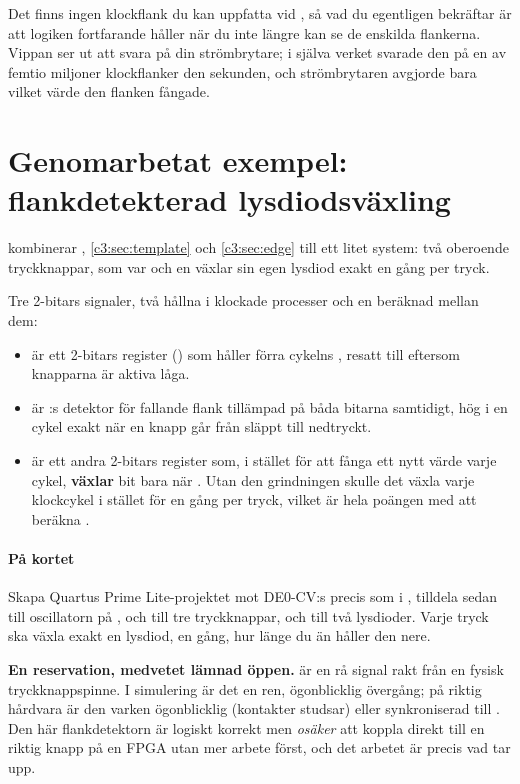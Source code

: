 Det finns ingen klockflank du kan uppfatta vid , så vad du egentligen bekräftar är att
logiken fortfarande håller när du inte längre kan se de enskilda flankerna. Vippan ser ut att svara
på din strömbrytare; i själva verket svarade den på en av femtio miljoner klockflanker den
sekunden, och strömbrytaren avgjorde bara vilket värde den flanken fångade.

\section{Genomarbetat exempel: flankdetekterad lysdiodsväxling}
\label{c3:sec:ledtoggle}

 kombinerar , \ref{c3:sec:template} och
\ref{c3:sec:edge} till ett litet system: två oberoende tryckknappar, som var och en växlar sin egen
lysdiod exakt en gång per tryck.


Tre 2-bitars signaler, två hållna i klockade processer och en beräknad mellan dem:
\begin{itemize}
  \item {} är ett 2-bitars register () som håller förra
    cykelns , resatt till  eftersom knapparna är aktiva låga.
  \item {} är :s detektor
    för fallande flank tillämpad på båda bitarna samtidigt, hög i en cykel exakt när en knapp går
    från släppt till nedtryckt.
  \item {} är ett andra 2-bitars register som, i stället för att fånga ett nytt värde
    varje cykel, \textbf{växlar} bit  bara när . Utan den
    grindningen skulle det växla varje klockcykel i stället för en gång per tryck, vilket är hela
    poängen med att beräkna .
\end{itemize}

\paragraph{På kortet}
Skapa Quartus Prime Lite-projektet mot DE0-CV:s  precis som i ,
tilldela sedan  till oscillatorn på ,  och
 till tre tryckknappar, och  till två lysdioder.
Varje tryck ska växla exakt en lysdiod, en gång, hur länge du än håller den nere.

\begin{warning}
\textbf{En reservation, medvetet lämnad öppen.}  är en rå signal rakt från en fysisk
tryckknappspinne. I simulering är det en ren, ögonblicklig övergång; på riktig hårdvara är den
varken ögonblicklig (kontakter studsar) eller synkroniserad till . Den här
flankdetektorn är logiskt korrekt men \emph{osäker} att koppla direkt till en riktig knapp på en
FPGA utan mer arbete först, och det arbetet är precis vad  tar upp.
\end{warning}
